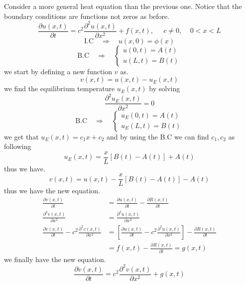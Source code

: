 \documentclass[]{article}
\begin{document}
Consider a more general heat equation than the previous one. Notice that the boundary conditions are functions not zeros as before.
\\
\begin{equation}
\frac{\partial u(x,t)}{\partial t} = c^2 \frac{\partial^2 u(x,t)}{\partial x^2} + f(x,t), \;\;\;\;\; c\neq 0, \;\;\;\; 0<x<L
\end{equation}
\begin{equation}
\text{I.C} \quad \Longrightarrow \quad u(x,0) = \phi(x)
\end{equation}
\[
    \text{B.C} \quad \Longrightarrow \quad
    \begin{cases}
        u(0,t) = A(t)
        \\
        u(L,t) = B(t)        
    \end{cases}    
\]
we start by defining a new function $v$ as.
\[
v(x,t) = u(x,t) - u_E(x,t)    
\]
we find the equilibrium temperature $u_E(x,t)$ by solving 
\[
    \frac{\partial^2 u_E(x,t)}{\partial x^2}  = 0
\]
\[
    \text{B.C} \quad \Longrightarrow \quad
    \begin{cases}
        u_E(0,t) = A(t)
        \\
        u_E(L,t) = B(t)        
    \end{cases}    
\]
we get that $u_E(x,t) = c_1 x + c_2$ and by using the B.C we can find $c_1,c_2$ as following
\[
u_E(x,t) = \frac{x}{L}[B(t)-A(t)] +A(t)    
\]
thus we have.
\begin{equation}
v(x,t) = u(x,t) -  \frac{x}{L}[B(t)-A(t)] -A(t)
\end{equation}
thus we have the new equation.
\begin{align*}
\frac{\partial v(x,t)}{\partial t} &= \frac{\partial u(x,t)}{\partial t} - \frac{\partial R(x,t)}{\partial t}
\\
\frac{\partial^2 v(x,t)}{\partial x^2} &= \frac{\partial^2 u(x,t)}{\partial x^2}
\\
\frac{\partial v(x,t)}{\partial t} - c^2 \frac{\partial^2 v(x,t)}{\partial x^2} &= \left[ \frac{\partial u(x,t)}{\partial t} - c^2 \frac{\partial^2 u(x,t)}{\partial x^2}\right] - \frac{\partial R(x,t)}{\partial t}
\\
&= f(x,t) - \frac{\partial R(x,t)}{\partial t} = g(x,t)
\end{align*}
we finally have the new equation.
\begin{equation}
\frac{\partial v(x,t)}{\partial t} = c^2 \frac{\partial^2 v(x,t)}{\partial x^2} + g(x,t)
\end{equation}
\end{document}
